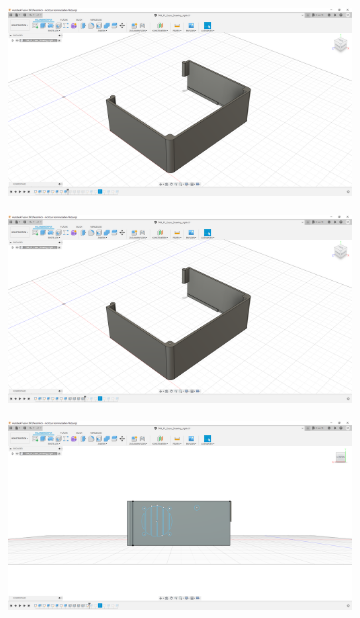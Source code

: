 \begin{figure}[h!tb]
\begin{subfigure}[t]{.3\linewidth}
		\caption[]{}
		\label{fig:design-right-06}
	\end{subfigure}
	\begin{subfigure}[t]{.3\linewidth}
		\includegraphics[width=\linewidth]{img/konstruktion_gehaeuse_rechts_007.png}
		\caption[]{}
		\label{fig:design-right-07}
	\end{subfigure}
	\begin{subfigure}[t]{.3\linewidth}
		\includegraphics[width=\linewidth]{img/konstruktion_gehaeuse_rechts_008.png}
		\caption[]{}
		\label{fig:design-right-08}
	\end{subfigure}
	\begin{subfigure}[t]{.3\linewidth}
		\includegraphics[width=\linewidth]{img/konstruktion_gehaeuse_rechts_009.png}

\end{subfigure}
\end{figure}
